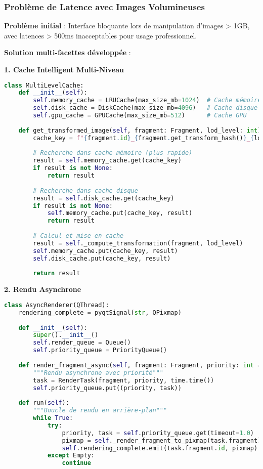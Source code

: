 \documentclass[12pt,a4paper]{report}
\begin{document}
\subsubsection{Problème de Latence avec Images Volumineuses}

\textbf{Problème initial} : Interface bloquante lors de manipulation d'images > 1GB, avec latences > 500ms inacceptables pour usage professionnel.

\textbf{Solution multi-facettes développée} :

\textbf{1. Cache Intelligent Multi-Niveau}
\begin{lstlisting}[language=Python]
class MultiLevelCache:
    def __init__(self):
        self.memory_cache = LRUCache(max_size_mb=1024)  # Cache mémoire
        self.disk_cache = DiskCache(max_size_mb=4096)   # Cache disque
        self.gpu_cache = GPUCache(max_size_mb=512)      # Cache GPU
    
    def get_transformed_image(self, fragment: Fragment, lod_level: int) -> np.ndarray:
        cache_key = f"{fragment.id}_{fragment.get_transform_hash()}_{lod_level}"
        
        # Recherche dans cache mémoire (plus rapide)
        result = self.memory_cache.get(cache_key)
        if result is not None:
            return result
        
        # Recherche dans cache disque
        result = self.disk_cache.get(cache_key)
        if result is not None:
            self.memory_cache.put(cache_key, result)
            return result
        
        # Calcul et mise en cache
        result = self._compute_transformation(fragment, lod_level)
        self.memory_cache.put(cache_key, result)
        self.disk_cache.put(cache_key, result)
        
        return result
\end{lstlisting}

\textbf{2. Rendu Asynchrone}
\begin{lstlisting}[language=Python]
class AsyncRenderer(QThread):
    rendering_complete = pyqtSignal(str, QPixmap)
    
    def __init__(self):
        super().__init__()
        self.render_queue = Queue()
        self.priority_queue = PriorityQueue()
    
    def render_fragment_async(self, fragment: Fragment, priority: int = 0):
        """Rendu asynchrone avec priorité"""
        task = RenderTask(fragment, priority, time.time())
        self.priority_queue.put((priority, task))
        
    def run(self):
        """Boucle de rendu en arrière-plan"""
        while True:
            try:
                priority, task = self.priority_queue.get(timeout=1.0)
                pixmap = self._render_fragment_to_pixmap(task.fragment)
                self.rendering_complete.emit(task.fragment.id, pixmap)
            except Empty:
                continue
\end{lstlisting}
\end{document}
